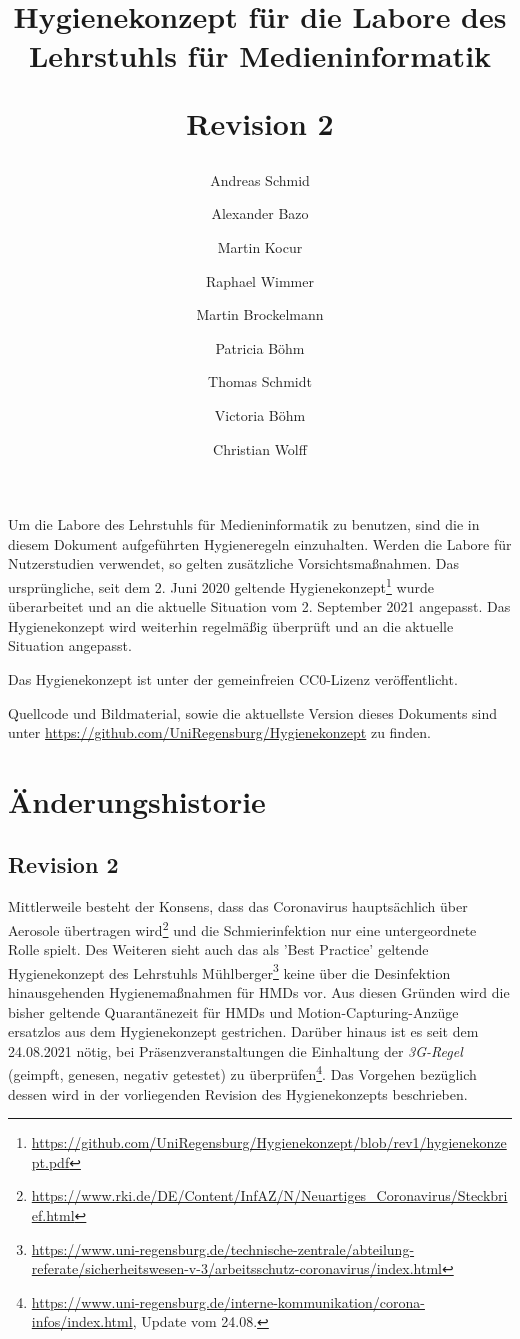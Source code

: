 \documentclass[hidelinks,12pt]{extarticle}
\title{
    \bfseries
    \sffamily
    Hygienekonzept für die Labore des Lehrstuhls für Medieninformatik

    \medskip
    \large{Revision 2}
}
\author{Andreas Schmid}
\author{Alexander Bazo}
\author{Martin Kocur}
\author{Raphael Wimmer}
\author{Martin Brockelmann}
\author{Patricia Böhm}
\author{Thomas Schmidt}
\author{Victoria Böhm}
\author{Christian Wolff}
\affil{Lehrstuhl für Medieninformatik, Universität Regensburg}
\begin{document}
\onehalfspacing
\maketitle

\noindent
Um die Labore des Lehrstuhls für Medieninformatik zu benutzen, sind die in diesem Dokument aufgeführten Hygieneregeln einzuhalten.
Werden die Labore für Nutzerstudien verwendet, so gelten zusätzliche Vorsichtsmaßnahmen.
Das ursprüngliche, seit dem 2. Juni 2020 geltende Hygienekonzept\footnote{\url{https://github.com/UniRegensburg/Hygienekonzept/blob/rev1/hygienekonzept.pdf}} wurde überarbeitet und an die aktuelle Situation vom 2. September 2021 angepasst.
Das Hygienekonzept wird weiterhin regelmäßig überprüft und an die aktuelle Situation angepasst.

\medskip
\noindent
Das Hygienekonzept ist unter der gemeinfreien CC0-Lizenz veröffentlicht.

\noindent
Quellcode und Bildmaterial, sowie die aktuellste Version dieses Dokuments sind unter \url{https://github.com/UniRegensburg/Hygienekonzept} zu finden.

\newpage

\section*{Änderungshistorie}\label{app:changelog}

\subsection*{Revision 2}

Mittlerweile besteht der Konsens, dass das Coronavirus hauptsächlich über Aerosole übertragen wird\footnote{\url{https://www.rki.de/DE/Content/InfAZ/N/Neuartiges_Coronavirus/Steckbrief.html}} und die Schmierinfektion nur eine untergeordnete Rolle spielt.
Des Weiteren sieht auch das als 'Best Practice' geltende Hygienekonzept des Lehrstuhls Mühlberger\footnote{\url{ https://www.uni-regensburg.de/technische-zentrale/abteilung-referate/sicherheitswesen-v-3/arbeitsschutz-coronavirus/index.html}} keine über die Desinfektion hinausgehenden Hygienemaßnahmen für HMDs vor.
Aus diesen Gründen wird die bisher geltende Quarantänezeit für HMDs und Motion-Capturing-Anzüge ersatzlos aus dem Hygienekonzept gestrichen.
Darüber hinaus ist es seit dem 24.08.2021 nötig, bei Präsenzveranstaltungen die Einhaltung der \emph{3G-Regel} (geimpft, genesen, negativ getestet) zu überprüfen\footnote{\url{https://www.uni-regensburg.de/interne-kommunikation/corona-infos/index.html}, Update vom 24.08.}.
Das Vorgehen bezüglich dessen wird in der vorliegenden Revision des Hygienekonzepts beschrieben.
\end{document}
